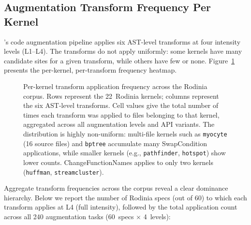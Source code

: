 \subsection{Augmentation Transform Frequency Per Kernel}
\label{sec:appendix-e1}

\parbench{}'s code augmentation pipeline applies six AST-level transforms at four
intensity levels (L1--L4). The transforms do not apply uniformly: some kernels
have many candidate sites for a given transform, while others have few or none.
Figure~\ref{fig:transform-freq} presents the per-kernel, per-transform frequency
heatmap.

\begin{figure}[htbp]
  \centering
  
  \caption{Per-kernel transform application frequency across the Rodinia corpus.
    Rows represent the 22~Rodinia kernels; columns represent the six AST-level
    transforms. Cell values give the total number of times each transform was
    applied to files belonging to that kernel, aggregated across all
    augmentation levels and API variants. The distribution is highly
    non-uniform: multi-file kernels such as \texttt{myocyte} (16 source files)
    and \texttt{bptree} accumulate many SwapCondition applications, while
    smaller kernels (e.g., \texttt{pathfinder}, \texttt{hotspot}) show lower
    counts. ChangeFunctionNames applies to only two kernels
    (\texttt{huffman}, \texttt{streamcluster}).}
  \label{fig:transform-freq}
\end{figure}

Aggregate transform frequencies across the corpus reveal a clear dominance hierarchy. Below we report the number of Rodinia specs (out of 60) to which each transform applies at L4 (full intensity), followed by the total application count across all 240 augmentation tasks (60~specs $\times$ 4~levels):
  
